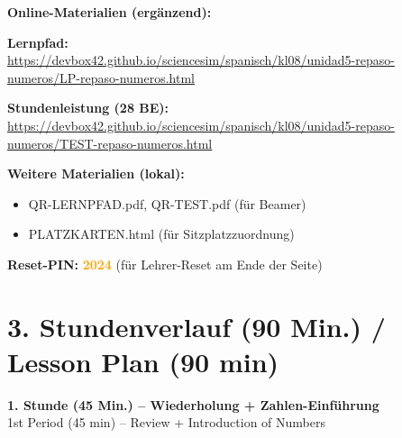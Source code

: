 \documentclass[11pt, a4paper]{article}
\newcommand{\en}[1]{{\scriptsize\textcolor{grau}{#1}}}
\begin{document}
\vspace{0.5em}

\begin{digitalbox}
\textbf{Online-Materialien (ergänzend):}

\vspace{0.5em}
\textbf{Lernpfad:}\\
\url{https://devbox42.github.io/sciencesim/spanisch/kl08/unidad5-repaso-numeros/LP-repaso-numeros.html}

\vspace{0.3em}
\textbf{Stundenleistung (28 BE):}\\
\url{https://devbox42.github.io/sciencesim/spanisch/kl08/unidad5-repaso-numeros/TEST-repaso-numeros.html}

\vspace{0.3em}
\textbf{Weitere Materialien (lokal):}
\begin{itemize}[label=$\square$, nosep]
    \item QR-LERNPFAD.pdf, QR-TEST.pdf (für Beamer)
    \item PLATZKARTEN.html (für Sitzplatzzuordnung)
\end{itemize}

\vspace{0.3em}
\textbf{Reset-PIN:} \textcolor{orange}{\textbf{2024}} (für Lehrer-Reset am Ende der Seite)
\end{digitalbox}


\section*{3. Stundenverlauf (90 Min.) / Lesson Plan (90 min)}

\textbf{1. Stunde (45 Min.) -- Wiederholung + Zahlen-Einführung}\\
\en{1st Period (45 min) -- Review + Introduction of Numbers}
\end{document}
